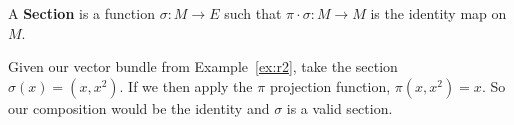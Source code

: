 \begin{definition}[Section]
A \textbf{Section} is a function $\sigma : M \rightarrow E$ such that $\pi \cdot \sigma : M \rightarrow M$ is the identity map on $M$.
\end{definition}

\begin{example} Given our vector bundle from Example~\ref{ex:r2},  take the section $\sigma(x) = (x,x^2)$.  If we then apply the $\pi$ projection function, $\pi (x,x^2) = x$.  So our composition would be the identity and $\sigma$ is a valid section.
\end{example}
